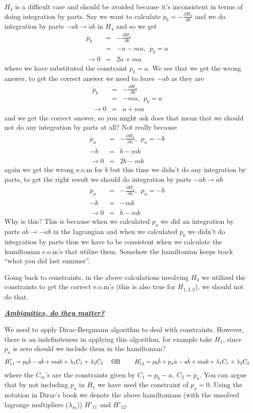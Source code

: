 \documentclass[aps,preprint,preprintnumbers,nofootinbib,showpacs,prd]{revtex4-1}
\newcommand{\nbea}{\begin{eqnarray*}}
\newcommand{\neea}{\end{eqnarray*}}
\begin{document}
$H_4$ is a difficult case and should be avoided because it's inconsistent in terms of doing integration by parts. Say we want to calculate $\dot p_b = -\frac{\partial H_4}{\partial b}$ and we do integration by parts $-a\dot b \to \dot a b$ in $H_4$ and so we get
%
\nbea
\dot p_b & = & -\frac{\partial H_4}{\partial b} \\
& = & -\dot a - ma, ~~p_b = a \\
\to 0 & = & 2\dot a + ma
\neea
%
where we have substituted the constraint $p_b = a$. We see that we get the wrong answer, to get the correct answer we need to leave $-a\dot b$ as they are 
%
\nbea
\dot p_b & = & -\frac{\partial H_4}{\partial b} \\
& = & - ma, ~~p_b = a \\
\to 0 & = & \dot a + ma
\neea
%
and we get the correct answer, so you might ask does that mean that we should not do any integration by parts at all? Not really because
%
\nbea
\dot p_a & = & -\frac{\partial H_4}{\partial a}, ~~p_a = - b \\
-\dot b & = & \dot b - mb \\
\to 0 & = & 2\dot b - mb
\neea
%
again we get the wrong e.o.m for $b$ but this time we didn't do any integration by parts, to get the right result we should do integration by parts $-a\dot b \to \dot a b$
%
\nbea
\dot p_a & = & -\frac{\partial H_4}{\partial a}, ~~p_a = - b \\
-\dot b & = & - mb \\
\to 0 & = & \dot b - mb
\neea
%
Why is this? This is because when we calculated $p_a$ we did an integration by parts $a\dot b \to -\dot ab$ in the lagrangian and when we calculated $p_b$ we didn't do integration by parts thus we have to be consistent when we calculate the hamiltonian e.o.m's that utilize them. Somehow the hamiltonian keeps track ``what you did last summer''.

Going back to constraints, in the above calculations involving $H_4$ we utilized the constraints to get the correct e.o.m's (this is also true for $H_{1,2,3}$), we should not do that. 

\bigskip
\underline{\textbf{\textit{Ambiguities, do they matter?}}}

We need to apply Dirac-Bergmann algorithm to deal with constraints. However, there is an indefiniteness in applying this algorithm, for example take $H_1$, since $p_a$ is zero should we include them in the hamiltonian?
%
\nbea
H'_{11} = p_b \dot b - a\dot b + mab + \lambda_1 C_1 + \lambda_2 C_2 & ~~~~{\rm OR}~~~~ & H'_{12} = p_b \dot b + p_a \dot a - a\dot b + mab + \lambda_1 C_1 + \lambda_2 C_2
\neea
%
where the $C_m$'s are the constraints given by $C_1 = p_b - a,~C_2 = p_a$. You can argue that by not including $p_a$ in $H_1$ we have used the constraint of $p_a=0$. Using the notation in Dirac's book we denote the above hamiltonians (with the unsolved lagrange multipliers ($\lambda_m$)) $H'_{11}$ and $H'_{12}$.
\end{document}
